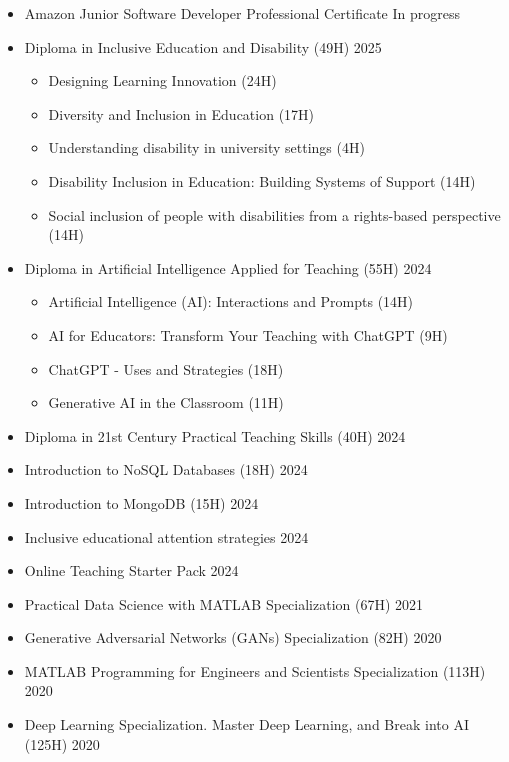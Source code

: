 \documentclass[11pt,a4paper]{article}
\begin{document}
\begin{itemize}
    \item Amazon Junior Software Developer Professional Certificate \hfill In progress
    \item Diploma in Inclusive Education and Disability (49H) \hfill 2025
    \begin{itemize}
        \item Designing Learning Innovation (24H)
        \item Diversity and Inclusion in Education (17H)
        \item Understanding disability in university settings (4H)
        \item Disability Inclusion in Education: Building Systems of Support (14H)
        \item Social inclusion of people with disabilities from a rights-based perspective (14H)
    \end{itemize}
    \item Diploma in Artificial Intelligence Applied for Teaching (55H) \hfill 2024
    \begin{itemize}
        \item Artificial Intelligence (AI): Interactions and Prompts (14H)
        \item AI for Educators: Transform Your Teaching with ChatGPT (9H)
        \item ChatGPT - Uses and Strategies (18H)
        \item Generative AI in the Classroom (11H)
    \end{itemize}
    \item Diploma in 21st Century Practical Teaching Skills (40H) \hfill 2024
    \item Introduction to NoSQL Databases (18H) \hfill 2024
    \item Introduction to MongoDB (15H) \hfill 2024
    \item Inclusive educational attention strategies \hfill 2024
    \item Online Teaching Starter Pack \hfill 2024
    \item Practical Data Science with MATLAB Specialization (67H) \hfill 2021
    \item Generative Adversarial Networks (GANs) Specialization (82H) \hfill 2020
    \item MATLAB Programming for Engineers and Scientists Specialization (113H) \hfill 2020
    \item Deep Learning Specialization. Master Deep Learning, and Break into AI (125H) \hfill 2020
\end{itemize}
\end{document}
